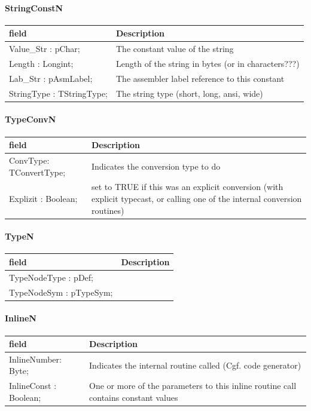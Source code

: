 \documentclass [a4paper,12pt]{article}
\begin{document}
\paragraph{StringConstN}\mbox{}

\begin{longtable}{|l|p{10cm}|}
\hline
field	& Description \\
\hline
\endhead
\hline
\endfoot
\textsf{Value{\_}Str : pChar;}    & The constant value of the string \\
\textsf{Length : Longint;}	  & Length of the string in bytes (or in characters???) \\
\textsf{Lab{\_}Str : pAsmLabel;}  & The assembler label reference to this constant \\
\textsf{StringType : TStringType;}& The string type (short, long, ansi, wide)
\label{tab22}
\end{longtable}

\paragraph{TypeConvN}\mbox{}

\begin{longtable}{|l|p{10cm}|}
\hline
field	& Description \\
\hline
\endhead
\hline
\endfoot
\textsf{ConvType: TConvertType;}& Indicates the conversion type to do \\
\textsf{Explizit : Boolean;}&
	set to TRUE if this was an explicit conversion (with explicit
	typecast, or calling one of the internal conversion routines)
\label{tab23}
\end{longtable}

\paragraph{TypeN}\mbox{}

\begin{longtable}{|l|p{10cm}|}
\hline
field	& Description \\
\hline
\endhead
\hline
\endfoot
\textsf{TypeNodeType : pDef;}&  \\
\textsf{TypeNodeSym : pTypeSym;}& 
\label{tab24}
\end{longtable}

\paragraph{InlineN}\mbox{}

\begin{longtable}{|l|p{10cm}|}
\hline
field	& Description \\
\hline
\endhead
\hline
\endfoot
\textsf{InlineNumber: Byte;}    &  Indicates the internal routine called (Cgf. code generator) \\
\textsf{InlineConst : Boolean;} &
	One or more of the parameters to this inline routine call contains
	constant values
\label{tab25}
\end{longtable}
\end{document}
